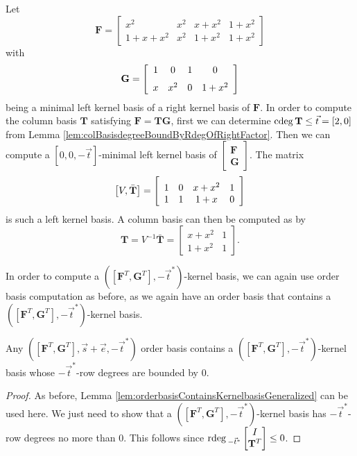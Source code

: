 \begin{exmp}
Let 
\[
\mathbf{F}=\left[\begin{array}{cccc}
x^{2} & x^{2} & x+x^{2} & 1+x^{2}\\
1+x+x^{2} & x^{2} & 1+x^{2} & 1+x^{2}
\end{array}\right]
\]
with 
\[
\mathbf{G}=\left[\begin{array}{cccc}
1 & 0 & 1 & 0\\
\noalign{\medskip}x & {x}^{2} & 0 & 1+{x}^{2}
\end{array}\right]
\]
being a minimal left kernel basis of a right kernel basis of $\mathbf{F}$.
In order to compute the column basis $\mathbf{T}$ satisfying $\mathbf{F}=\mathbf{T}\mathbf{G}$,
first we can determine ${\rm cdeg}\,\mathbf{T}\le\vec{t}=\left[2,0\right]$
from Lemma \ref{lem:colBasisdegreeBoundByRdegOfRightFactor}. Then
we can compute a $\left[0,0,-\vec{t}\right]$-minimal left kernel
basis of $\begin{bmatrix}\mathbf{F}\\
\mathbf{G}
\end{bmatrix}$. The matrix 
\[
\left[V,\bar{\mathbf{T}}\right]=\left[\begin{array}{cccc}
\noalign{\medskip}1 & 0 & x+{x}^{2} & 1\\
1 & 1 & 1+x & 0
\end{array}\right]
\]
is such a left kernel basis. A column basis can then be computed as
by 
\[
\mathbf{T}=V^{-1}\bar{\mathbf{T}}=\left[\begin{array}{cc}
x+x^{2} & 1\\
1+{x}^{2} & 1
\end{array}\right].
\]

\end{exmp}
In order to compute a $\left(\left[\mathbf{F}^{T},\mathbf{G}^{T}\right],-\vec{t}^{*}\right)$-kernel
basis, we can again use order basis computation as before, as we again
have an order basis that contains a $\left(\left[\mathbf{F}^{T},\mathbf{G}^{T}\right],-\vec{t}^{*}\right)$-kernel
basis.
\begin{lem}
Any $\left(\left[\mathbf{F}^{T},\mathbf{G}^{T}\right],\vec{s}+\vec{e},-\vec{t}^{*}\right)$
order basis contains a $\left(\left[\mathbf{F}^{T},\mathbf{G}^{T}\right],-\vec{t}^{*}\right)$-kernel
basis whose $-\vec{t}^{*}$-row degrees are bounded by 0. \end{lem}
\begin{proof}
As before, Lemma \ref{lem:orderbasisContainsKernelbasisGeneralized}
can be used here. We just need to show that a $\left(\left[\mathbf{F}^{T},\mathbf{G}^{T}\right],-\vec{t}^{*}\right)$-kernel
basis has $-\vec{t}^{*}$-row degrees no more than $0$. This follows
since ${\rm rdeg}\,_{-\vec{t}^{*}}\begin{bmatrix}I\\
\mathbf{T}^{T}
\end{bmatrix}\le0$. 
\end{proof}
